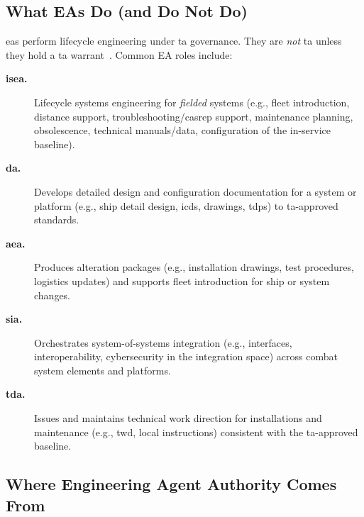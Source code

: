 \documentclass[../main.tex]{subfiles}
\begin{document}
\subsection{What EAs Do (and Do Not Do)}

\acp{ea} perform lifecycle engineering under \ac{ta} governance. They are \emph{not} \ac{ta} unless they hold a \ac{ta} warrant~\autocite{edo-2-1-5-technical-authority-2025}. Common EA roles include:
\begin{description}
  \item[\textbf{\ac{isea}.}] Lifecycle systems engineering for \emph{fielded} systems (e.g., fleet introduction, distance support, troubleshooting/\ac{casrep} support, maintenance planning, obsolescence, technical manuals/data, configuration of the in-service baseline).
  \item[\textbf{\ac{da}.}] Develops detailed design and configuration documentation for a system or platform (e.g., ship detail design, \acp{icd}, drawings, \acp{tdp}) to \ac{ta}-approved standards.
  \item[\textbf{\ac{aea}.}] Produces alteration packages (e.g., installation drawings, test procedures, logistics updates) and supports fleet introduction for ship or system changes.
  \item[\textbf{\ac{sia}.}] Orchestrates system-of-systems integration (e.g., interfaces, interoperability, cybersecurity in the integration space) across combat system elements and platforms.
  \item[\textbf{\ac{tda}.}] Issues and maintains technical work direction for installations and maintenance (e.g., \ac{twd}, local instructions) consistent with the \ac{ta}-approved baseline.
\end{description}

\subsection{Where Engineering Agent Authority Comes From}
\end{document}
